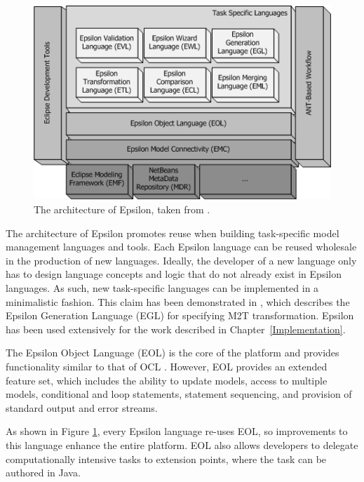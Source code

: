 \begin{figure}[htbp]
  \begin{center}
    \leavevmode
    \includegraphics[scale=0.6]{2.Background/images/epsilon.png}
  \end{center}
  \caption[The architecture of Epsilon]{The architecture of Epsilon, taken from \cite{rose08egl}.}
  \label{fig:epsilon}
\end{figure}

The architecture of Epsilon promotes reuse when building task-specific model management languages and tools. Each Epsilon language can be reused wholesale in the production of new languages. Ideally, the developer of a new language only has to design language concepts and logic that do not already exist in Epsilon languages. As such, new task-specific languages can be implemented in a minimalistic fashion. This claim has been demonstrated in \cite{rose08egl}, which describes the Epsilon Generation Language (EGL) for specifying M2T transformation. Epsilon has been used extensively for the work described in Chapter~\ref{Implementation}. 

The Epsilon Object Language (EOL) \cite{kolovos06eol} is the core of the platform and provides functionality similar to that of OCL \cite{ocl2}. However, EOL provides an extended feature set, which includes the ability to update models, access to multiple models, conditional and loop statements, statement sequencing, and provision of standard output and error streams.

As shown in Figure \ref{fig:epsilon}, every Epsilon language re-uses EOL, so improvements to this language enhance the entire platform. EOL also allows developers to delegate computationally intensive tasks to extension points, where the task can be authored in Java.


